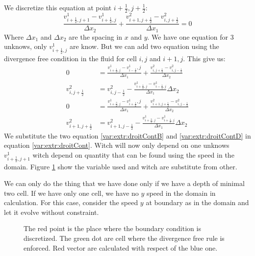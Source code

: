 We discretize this equation at point $i+\frac{1}{2},j+\frac{1}{2}$:
\begin{equation}
\label{var:extr:droitCont}
	\frac{v^{1}_{i+\frac{1}{2},j+1}-v^{1}_{i+\frac{1}{2},j}}{\Delta x_{2}}+\frac{v^{2}_{i+1,j+\frac{1}{2}}-v^{2}_{i,j+\frac{1}{2}}}{\Delta x_{1}}=0
\end{equation}
Where $\Delta x_{1}$ and $\Delta x_{2}$ are the spacing in $x$ and $y$.
We have one equation for 3 unknows, only $v^{1}_{i+\frac{1}{2},j}$ are know.
But we can add two equation using the divergence free condition in the fluid for cell $i,j$ and $i+1,j$.
This give us:
\begin{align}
\label{var:extr:droitContA}
	0&=\frac{v^{1}_{i+\frac{1}{2},j}-v^{1}_{i-\frac{1}{2}},j}{\Delta x_{1}}+\frac{v^{2}_{i,j+\frac{1}{2}}-v^{2}_{i,j-\frac{1}{2}}}{\Delta x_2}\\
\label{var:extr:droitContB}
	v^{2}_{i,j+\frac{1}{2}}&=v^{2}_{i,j-\frac{1}{2}}-\frac{v^{1}_{i+\frac{1}{2},j}-v^{1}_{i-\frac{1}{2},j}}{\Delta x_{1}}\Delta x_{2}\\
\label{var:extr:droitContC}
	0&=\frac{v^{1}_{i+\frac{3}{2},j}-v^{1}_{i+\frac{1}{2}},j}{\Delta x_{1}}+\frac{v^{2}_{i+1,j+\frac{1}{2}}-v^{2}_{i,j-\frac{1}{2}}}{\Delta x_2}\\
\label{var:extr:droitContD}
	v^{2}_{i+1,j+\frac{1}{2}}&=v^{2}_{i+1,j-\frac{1}{2}}-\frac{v^{1}_{i+\frac{3}{2},j}-v^{1}_{i+\frac{1}{2},j}}{\Delta x_{1}}\Delta x_{2}
\end{align}
We substitute the two equation \ref{var:extr:droitContB} and \ref{var:extr:droitContD} in equation \ref{var:extr:droitCont}.
Witch will now only depend on one unknows $v^{1}_{i+\frac{1}{2},j+1}$ witch depend on quantity that can be found using the speed in the domain.
Figure \ref{topology:extrap:plane} show the variable used and witch are substitute from other.

We can only do the thing that we have done only if we have a depth of minimal two cell.
If we have only one cell, we have no $y$ speed in the domain in calculation.
For this case, consider the speed $y$ at boundary as in the domain and let it evolve without constraint.

\begin{figure}
\caption{The red point is the place where the boundary condition is discretized.
The green dot are cell where the divergence free rule is enforced. Red vector are calculated with respect of the blue one.}
\label{topology:extrap:plane}
\end{figure}

